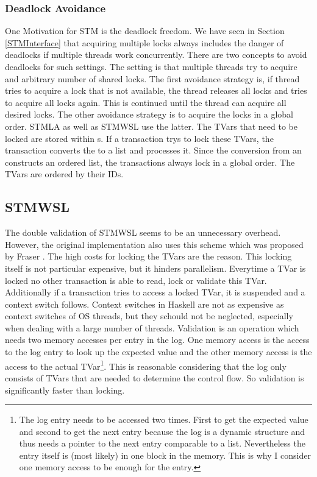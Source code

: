 \subsubsection{Deadlock Avoidance}
One Motivation for STM is the deadlock freedom. We have seen in Section \ref{STMInterface} that acquiring 
multiple locks always includes the danger of deadlocks if multiple threads work concurrently. 
There are two concepts to avoid deadlocks for such settings. The setting is that multiple threads
try to acquire and arbitrary number of shared locks. The first avoidance strategy is, if thread tries to 
acquire a lock that is not available, the thread releases all locks and tries to acquire all locks again.
This is continued until the thread can acquire all desired locks. The other avoidance strategy is to 
acquire the locks in a global order. STMLA as well as STMWSL use the latter. The TVars that need to be 
locked are stored within s. If a transaction trys to lock these TVars, the transaction converts 
the  to a list and processes it. Since the conversion from an  constructs an ordered 
list, the transactions always lock in a global order. The TVars are ordered by their IDs.


\subsection{STMWSL}
The double validation of STMWSL seems to be an unnecessary overhead. However, the original implementation 
also uses this scheme which was proposed by Fraser \parencite[Page 42]{lockfreedom}. The high costs for locking the TVars
are the reason. This locking itself is not particular expensive, but it hinders parallelism.
Everytime a TVar is locked no other transaction is able to read, lock or validate this TVar. Additionally if 
a transaction tries to access a locked TVar, it is suspended and a context switch follows. Context switches in Haskell 
are not as expensive as context switches of OS threads, but they schould not be neglected, especially when dealing
with a large number of threads. Validation is an operation which needs two memory accesses per entry in the log.
One memory access is the access to the log entry to look up the expected value and the other memory access is
the access to the actual TVar\footnote{The log entry needs to be accessed two times. First to get the expected
value and second to get the next entry because the log is a dynamic structure and thus needs a pointer
to the next entry comparable to a list. Nevertheless the entry itself is (most likely) in one block in the memory.
This is why I consider one memory access to be enough for the entry.}. This is reasonable considering that the 
log only consists of TVars that are needed to determine the control flow. So validation is significantly faster
than locking. 

